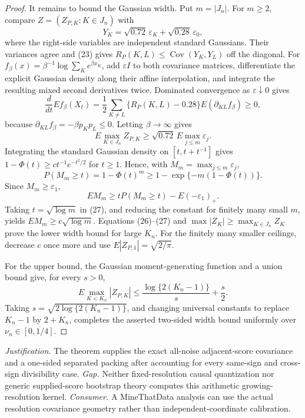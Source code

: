 \documentclass{article}
\begin{document}
\begin{proof}
It remains to bound the Gaussian width.  Put \(m=|J_n|\).  For \(m\geq2\), compare \(Z=(Z_{P,K}:K\in J_n)\) with
\[
 Y_K=\sqrt{0.72}\,\varepsilon_K+\sqrt{0.28}\,\varepsilon_0,
\]
where the right-side variables are independent standard Gaussians.  Their variances agree and (23) gives \(R_P(K,L)\leq\operatorname{Cov}(Y_K,Y_L)\) off the diagonal.  For
\(f_\beta(x)=\beta^{-1}\log\sum_Ke^{\beta x_K}\), add \(\varepsilon I\) to both covariance matrices, differentiate the explicit Gaussian density along their affine interpolation, and integrate the resulting mixed second derivatives twice.  Dominated convergence as \(\varepsilon\downarrow0\) gives
\[
 \frac d{dt}E f_\beta(X_t)
 =\frac12\sum_{K\neq L}\{R_P(K,L)-0.28\}E(\partial_{KL}f_\beta)\geq0,          \tag{25}
\]
because \(\partial_{KL}f_\beta=-\beta p_Kp_L\leq0\).  Letting \(\beta\to\infty\) gives
\[
 E\max_{K\in J_n}Z_{P,K}\geq\sqrt{0.72}\,E\max_{j\leq m}\varepsilon_j.       \tag{26}
\]
Integrating the standard Gaussian density on \([t,t+t^{-1}]\) gives \(1-\Phi(t)\geq ct^{-1}e^{-t^2/2}\) for \(t\geq1\).  Hence, with \(M_m=\max_{j\leq m}\varepsilon_j\),
\[
 P(M_m\geq t)=1-\Phi(t)^m\geq1-\exp\{-m(1-\Phi(t))\}.                          \tag{27}
\]
Since \(M_m\geq\varepsilon_1\),
\[
 EM_m\geq tP(M_m\geq t)-E(-\varepsilon_1)_+.
\]
Taking \(t=\sqrt{\log m}\) in (27), and reducing the constant for finitely many small \(m\), yields \(EM_m\geq c\sqrt{\log m}\).  Equations (26)--(27) and \(\max|Z_K|\geq\max_{K\in J_n}Z_K\) prove the lower width bound for large \(K_n\).  For the finitely many smaller ceilings, decrease \(c\) once more and use \(E|Z_{P,1}|=\sqrt{2/\pi}\).

For the upper bound, the Gaussian moment-generating function and a union bound give, for every \(s>0\),
\[
 E\max_{K<K_n}|Z_{P,K}|\leq\frac{\log\{2(K_n-1)\}}s+\frac s2.                  \tag{28}
\]
Taking \(s=\sqrt{2\log\{2(K_n-1)\}}\), and changing universal constants to replace \(K_n-1\) by \(2+K_n\), completes the asserted two-sided width bound uniformly over \(\nu_n\in[0,1/4]\).
\end{proof}
\par\smallskip\noindent \textit{Justification.} The theorem supplies the exact all-noise adjacent-score covariance and a one-sided separated packing after accounting for every same-sign and cross-sign divisibility case. \textit{Gap.} Neither fixed-resolution causal quantization nor generic supplied-score bootstrap theory computes this arithmetic growing-resolution kernel. \textit{Consumer.} A MineThatData analysis can use the actual resolution covariance geometry rather than independent-coordinate calibration.
\end{document}
